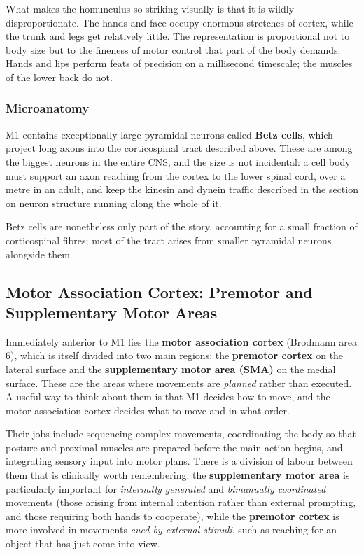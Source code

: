 \documentclass[11pt]{article}
\begin{document}
What makes the homunculus so striking visually is that it is wildly disproportionate. The hands and face occupy enormous stretches of cortex, while the trunk and legs get relatively little. The representation is proportional not to body size but to the fineness of motor control that part of the body demands. Hands and lips perform feats of precision on a millisecond timescale; the muscles of the lower back do not.

\subsubsection{Microanatomy}

M1 contains exceptionally large pyramidal neurons called \textbf{Betz cells}, which project long axons into the corticospinal tract described above. These are among the biggest neurons in the entire CNS, and the size is not incidental: a cell body must support an axon reaching from the cortex to the lower spinal cord, over a metre in an adult, and keep the kinesin and dynein traffic described in the section on neuron structure running along the whole of it.

Betz cells are nonetheless only part of the story, accounting for a small fraction of corticospinal fibres; most of the tract arises from smaller pyramidal neurons alongside them.

\subsection{Motor Association Cortex: Premotor and Supplementary Motor Areas}

Immediately anterior to M1 lies the \textbf{motor association cortex} (Brodmann area 6), which is itself divided into two main regions: the \textbf{premotor cortex} on the lateral surface and the \textbf{supplementary motor area (SMA)} on the medial surface. These are the areas where movements are \textit{planned} rather than executed. A useful way to think about them is that M1 decides how to move, and the motor association cortex decides what to move and in what order.

Their jobs include sequencing complex movements, coordinating the body so that posture and proximal muscles are prepared before the main action begins, and integrating sensory input into motor plans. There is a division of labour between them that is clinically worth remembering: the \textbf{supplementary motor area} is particularly important for \textit{internally generated} and \textit{bimanually coordinated} movements (those arising from internal intention rather than external prompting, and those requiring both hands to cooperate), while the \textbf{premotor cortex} is more involved in movements \textit{cued by external stimuli}, such as reaching for an object that has just come into view.
\end{document}
